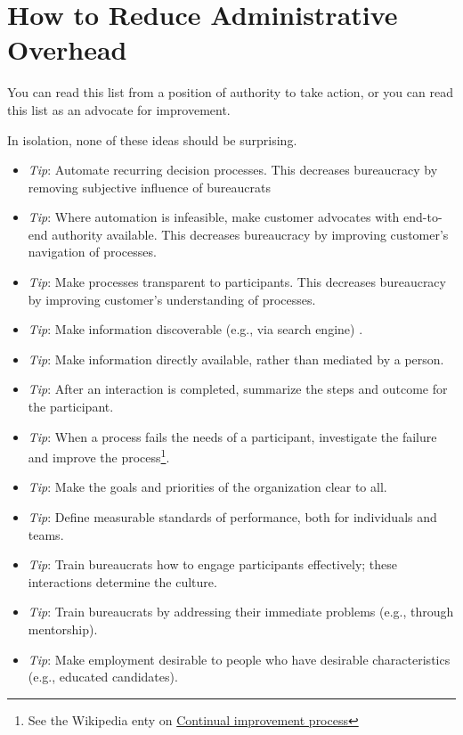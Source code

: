 \section{How to Reduce Administrative Overhead\label{sec:reducing-overhead}}

You can read this list from a position of authority to take action, or you can read this list as an advocate for improvement. 

In isolation, none of these ideas should be surprising.
\begin{itemize}
    \item \textit{Tip}: Automate recurring decision processes. This decreases bureaucracy by removing subjective influence of bureaucrats
\item \textit{Tip}: Where automation is infeasible, make customer advocates with end-to-end authority available. 
This decreases bureaucracy by improving customer's navigation of processes.
\item \textit{Tip}: Make processes transparent to participants. 
This decreases bureaucracy by improving customer's understanding of processes.
\item \textit{Tip}: Make information discoverable (e.g., via search engine) .
\item \textit{Tip}: Make information directly available, rather than mediated by a person.
\item \textit{Tip}: After an interaction is completed, summarize the steps and outcome for the participant. 
\item \textit{Tip}: When a process fails the needs of a participant, investigate the failure and improve the process\footnote{See the Wikipedia enty on \href{https://en.wikipedia.org/wiki/Continual_improvement_process}{Continual improvement process}}. 
\item \textit{Tip}: Make the goals and priorities of the organization clear to all.
\item \textit{Tip}: Define measurable standards of performance, both for individuals and teams.
\item \textit{Tip}: Train bureaucrats how to engage participants effectively; these interactions determine the culture.
\item \textit{Tip}: Train bureaucrats by addressing their immediate problems (e.g., through mentorship).
\item \textit{Tip}: Make employment desirable to people who have desirable characteristics (e.g., educated candidates).

\end{itemize}
